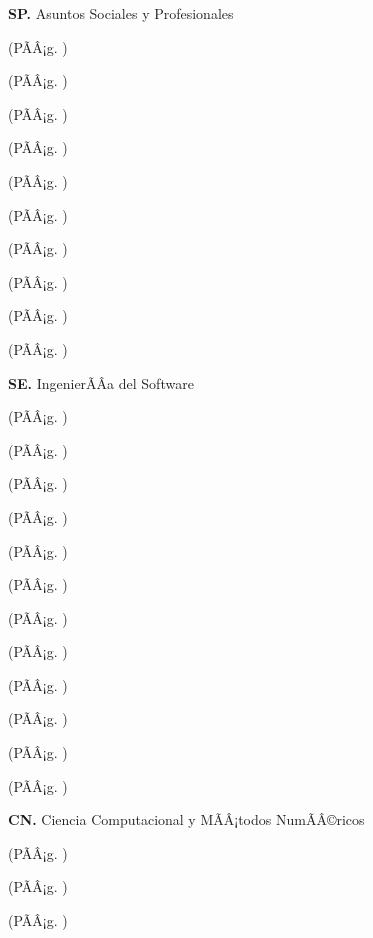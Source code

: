 	\textbf{SP.}  Asuntos Sociales y Profesionales%
	\begin{list}{}{%
		\setlength{\labelwidth}{0pt}%
		\setlength{\leftmargin}{15pt}}%
		\item \SPUNODef(PÃÂ¡g. \pageref{sec:BOK-SP1})
		\item \SPDOSDef(PÃÂ¡g. \pageref{sec:BOK-SP2})
		\item \SPTRESDef(PÃÂ¡g. \pageref{sec:BOK-SP3})
		\item \SPCUATRODef(PÃÂ¡g. \pageref{sec:BOK-SP4})
		\item \SPCINCODef(PÃÂ¡g. \pageref{sec:BOK-SP5})
		\item \SPSEISDef(PÃÂ¡g. \pageref{sec:BOK-SP6})
		\item \SPSIETEDef(PÃÂ¡g. \pageref{sec:BOK-SP7})
		\item \SPOCHODef(PÃÂ¡g. \pageref{sec:BOK-SP8})
		\item \SPNUEVEDef(PÃÂ¡g. \pageref{sec:BOK-SP9})
		\item \SPDIEZDef(PÃÂ¡g. \pageref{sec:BOK-SP10})
	\end{list}%
	\textbf{SE.}  IngenierÃÂ­a del Software%
	\begin{list}{}{%
		\setlength{\labelwidth}{0pt}%
		\setlength{\leftmargin}{15pt}}%
		\item \SEUNODef(PÃÂ¡g. \pageref{sec:BOK-SE1})
		\item \SEDOSDef(PÃÂ¡g. \pageref{sec:BOK-SE2})
		\item \SETRESDef(PÃÂ¡g. \pageref{sec:BOK-SE3})
		\item \SECUATRODef(PÃÂ¡g. \pageref{sec:BOK-SE4})
		\item \SECINCODef(PÃÂ¡g. \pageref{sec:BOK-SE5})
		\item \SESEISDef(PÃÂ¡g. \pageref{sec:BOK-SE6})
		\item \SESIETEDef(PÃÂ¡g. \pageref{sec:BOK-SE7})
		\item \SEOCHODef(PÃÂ¡g. \pageref{sec:BOK-SE8})
		\item \SENUEVEDef(PÃÂ¡g. \pageref{sec:BOK-SE9})
		\item \SEDIEZDef(PÃÂ¡g. \pageref{sec:BOK-SE10})
		\item \SEONCEDef(PÃÂ¡g. \pageref{sec:BOK-SE11})
		\item \SEDOCEDef(PÃÂ¡g. \pageref{sec:BOK-SE12})
	\end{list}%
	\textbf{CN.}  Ciencia Computacional y MÃÂ¡todos NumÃÂ©ricos%
	\begin{list}{}{%
		\setlength{\labelwidth}{0pt}%
		\setlength{\leftmargin}{15pt}}%
		\item \CNUNODef(PÃÂ¡g. \pageref{sec:BOK-CN1})
		\item \CNDOSDef(PÃÂ¡g. \pageref{sec:BOK-CN2})
		\item \CNTRESDef(PÃÂ¡g. \pageref{sec:BOK-CN3})
	\end{list}%

